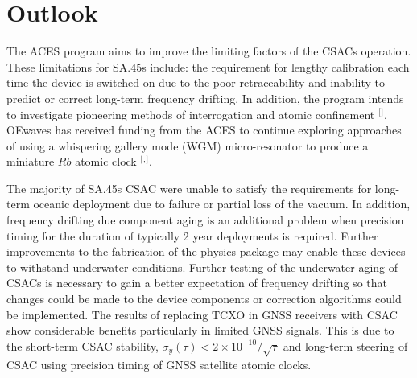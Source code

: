 \section{\label{sec:level1}Outlook}
The ACES program aims to improve the limiting factors of the CSACs operation. These limitations for SA.45s include: the requirement for lengthy calibration each time the device is switched on due to the poor retraceability and inability to predict or correct long-term frequency drifting. In addition, the program intends to investigate pioneering methods of interrogation and atomic confinement $^[$\citep{DARPA2016Broad}$^]$. OEwaves has received funding from the ACES to continue exploring approaches of using a  whispering gallery mode (WGM) micro-resonator to produce a miniature $Rb$ atomic clock $^[$\citep{Maleki2010All-opticalClock}$^,$\citep{Maleki2011All-OpticalClock}$^]$.

The majority of SA.45s CSAC were unable to satisfy the requirements for long-term oceanic deployment due to failure or partial loss of the vacuum. In addition, frequency drifting due component aging is an additional problem when precision timing for the duration of typically 2 year deployments is required. Further improvements to the fabrication of the physics package may enable these devices to withstand underwater conditions. Further testing of the underwater aging of CSACs is necessary to gain a better expectation of frequency drifting so that changes could be made to the device components or correction algorithms could be implemented. The results of replacing TCXO in GNSS receivers with CSAC show considerable benefits particularly in limited GNSS signals. This is due to the short-term CSAC stability, $\sigma_{y}(\tau) < 2\times 10^{-10}/\sqrt{\tau}$ and long-term steering of CSAC using precision timing of GNSS satellite atomic clocks.
